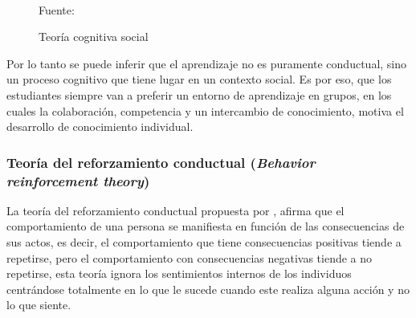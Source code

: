 \begin{figure}[ht]
\caption{Teoría cognitiva social}
\label{img:TCS}
\centering
{}
\\
{\footnotesize Fuente: }
\end{figure}

Por lo tanto se puede inferir que el aprendizaje no es puramente conductual, sino un proceso cognitivo que 
tiene lugar en un contexto social. Es por eso, que los estudiantes siempre van a preferir un entorno de 
aprendizaje en grupos, en los cuales la colaboración, competencia y un intercambio de conocimiento, motiva el
desarrollo de conocimiento individual.

\subsubsection{Teoría del reforzamiento conductual (\textit{Behavior reinforcement theory})}

La teoría del reforzamiento conductual propuesta por , afirma que el 
comportamiento de una persona se manifiesta en función de las consecuencias de sus actos, es decir, el 
comportamiento que tiene consecuencias positivas tiende a repetirse, pero el comportamiento con consecuencias
negativas tiende a no repetirse, esta teoría ignora los sentimientos internos de los individuos centrándose 
totalmente en lo que le sucede cuando este realiza alguna acción y no lo que siente.

